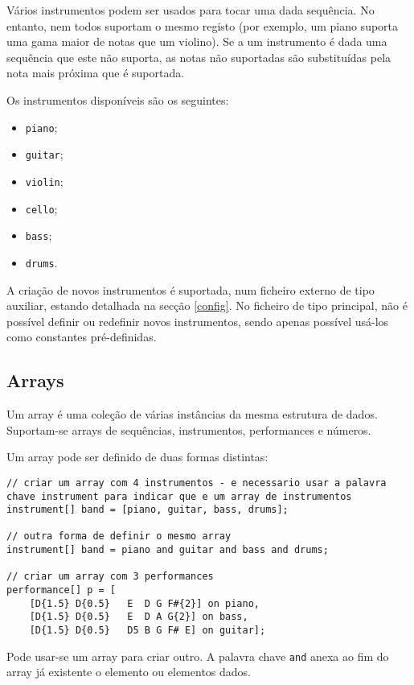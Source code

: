 \documentclass{article}
\begin{document}
Vários instrumentos podem ser usados para tocar uma dada sequência. No entanto, nem todos suportam o mesmo registo (por exemplo, um piano suporta uma gama maior de notas que um violino). Se a um instrumento é dada uma sequência que este não suporta, as notas não suportadas são substituídas pela nota mais próxima que é suportada. %

Os instrumentos disponíveis são os seguintes:
\begin{itemize}
    \item \texttt{piano};
    \item \texttt{guitar};
    \item \texttt{violin};
    \item \texttt{cello};
    \item \texttt{bass};
    \item \texttt{drums}.
\end{itemize}
A criação de novos instrumentos é suportada, num ficheiro externo de tipo auxiliar, estando detalhada na secção \ref{config}. No ficheiro de tipo principal, não é possível definir ou redefinir novos instrumentos, sendo apenas possível usá-los como constantes pré-definidas.

\subsection{Arrays}
Um array é uma coleção de várias instâncias da mesma estrutura de dados. Suportam-se arrays de sequências, instrumentos, performances e números.

Um array pode ser definido de duas formas distintas:
\begin{lstlisting} 
// criar um array com 4 instrumentos - e necessario usar a palavra chave instrument para indicar que e um array de instrumentos
instrument[] band = [piano, guitar, bass, drums];

// outra forma de definir o mesmo array
instrument[] band = piano and guitar and bass and drums;

// criar um array com 3 performances
performance[] p = [
    [D{1.5} D{0.5}   E  D G F#{2}] on piano, 
    [D{1.5} D{0.5}   E  D A G{2}] on bass,
    [D{1.5} D{0.5}   D5 B G F# E] on guitar];
\end{lstlisting} 

Pode usar-se um array para criar outro. A palavra chave \texttt{and} anexa ao fim do array já existente o elemento ou elementos dados.  %
\end{document}
